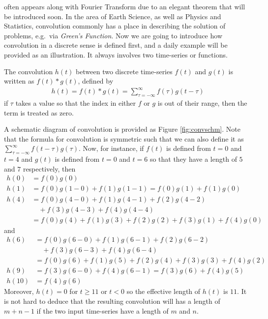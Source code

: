  often appears along with Fourier Transform due to an elegant theorem that will be introduced soon. In the area of Earth Science, as well as Physics and Statistics, convolution commonly has a place in describing the solution of problems, e.g.\ via \textit{Green's Function}. Now we are going to introduce how convolution in a discrete sense is defined first, and a daily example will be provided as an illustration. It always involves two time-series or functions.
\begin{defn}
\label{defn:convolution}
The convolution $h(t)$ between two discrete time-series $f(t)$ and $g(t)$ is written as $f(t) * g(t)$, defined by
\begin{align*}
h(t) = f(t) * g(t) = \sum_{\tau=-\infty}^{\infty} f(\tau) g(t-\tau)
\end{align*}
if $\tau$ takes a value so that the index in either $f$ or $g$ is out of their range, then the term is treated as zero.
\end{defn}
A schematic diagram of convolution is provided as Figure \ref{fig:convschm}. Note that the formula for convolution is symmetric such that we can also define it as $\sum_{\tau=-\infty}^{\infty} f(t-\tau) g(\tau)$. Now, for instance, if $f(t)$ is defined from $t = 0$ and $t = 4$ and $g(t)$ is defined from $t = 0$ and $t = 6$ so that they have a length of $5$ and $7$ respectively, then
\begin{align*}
h(0) &= f(0)g(0) \\
h(1) &= f(0)g(1-0) + f(1)g(1-1) = f(0)g(1) + f(1)g(0) \\
h(4) &= f(0)g(4-0) + f(1)g(4-1) + f(2)g(4-2) \\
&\quad + f(3)g(4-3) + f(4)g(4-4) \\
&= f(0)g(4) + f(1)g(3) + f(2)g(2) + f(3)g(1) + f(4)g(0)
\end{align*}
and
\begin{align*}
h(6) &= f(0)g(6-0) + f(1)g(6-1) + f(2)g(6-2) \\
&\quad + f(3)g(6-3) + f(4)g(6-4) \\
&= f(0)g(6) + f(1)g(5) + f(2)g(4) + f(3)g(3) + f(4)g(2) \\
h(9) &=  f(3)g(6-0) + f(4)g(6-1) = f(3)g(6) + f(4)g(5) \\
h(10) &= f(4)g(6)
\end{align*}
Moreover, $h(t) = 0$ for $t \geq 11$ or $t < 0$ so the effective length of $h(t)$ is $11$. It is not hard to deduce that the resulting convolution will has a length of $m + n - 1$ if the two input time-series have a length of $m$ and $n$.

